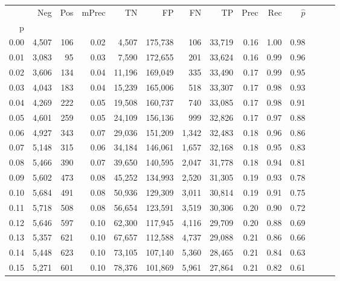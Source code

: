 \begin{tabular}{rrrrrrrrrrrrrr}
\toprule
{} &    Neg &  Pos & mPrec &       TN &       FP &      FN &      TP &  Prec &   Rec & $\hat{p}$ \\
p    &        &      &       &          &          &         &         &       &       &           \\
\midrule
0.00 &  4,507 &  106 &  0.02 &    4,507 &  175,738 &     106 &  33,719 &  0.16 &  1.00 &      0.98 \\
0.01 &  3,083 &   95 &  0.03 &    7,590 &  172,655 &     201 &  33,624 &  0.16 &  0.99 &      0.96 \\
0.02 &  3,606 &  134 &  0.04 &   11,196 &  169,049 &     335 &  33,490 &  0.17 &  0.99 &      0.95 \\
0.03 &  4,043 &  183 &  0.04 &   15,239 &  165,006 &     518 &  33,307 &  0.17 &  0.98 &      0.93 \\
0.04 &  4,269 &  222 &  0.05 &   19,508 &  160,737 &     740 &  33,085 &  0.17 &  0.98 &      0.91 \\
0.05 &  4,601 &  259 &  0.05 &   24,109 &  156,136 &     999 &  32,826 &  0.17 &  0.97 &      0.88 \\
0.06 &  4,927 &  343 &  0.07 &   29,036 &  151,209 &   1,342 &  32,483 &  0.18 &  0.96 &      0.86 \\
0.07 &  5,148 &  315 &  0.06 &   34,184 &  146,061 &   1,657 &  32,168 &  0.18 &  0.95 &      0.83 \\
0.08 &  5,466 &  390 &  0.07 &   39,650 &  140,595 &   2,047 &  31,778 &  0.18 &  0.94 &      0.81 \\
0.09 &  5,602 &  473 &  0.08 &   45,252 &  134,993 &   2,520 &  31,305 &  0.19 &  0.93 &      0.78 \\
0.10 &  5,684 &  491 &  0.08 &   50,936 &  129,309 &   3,011 &  30,814 &  0.19 &  0.91 &      0.75 \\
0.11 &  5,718 &  508 &  0.08 &   56,654 &  123,591 &   3,519 &  30,306 &  0.20 &  0.90 &      0.72 \\
0.12 &  5,646 &  597 &  0.10 &   62,300 &  117,945 &   4,116 &  29,709 &  0.20 &  0.88 &      0.69 \\
0.13 &  5,357 &  621 &  0.10 &   67,657 &  112,588 &   4,737 &  29,088 &  0.21 &  0.86 &      0.66 \\
0.14 &  5,448 &  623 &  0.10 &   73,105 &  107,140 &   5,360 &  28,465 &  0.21 &  0.84 &      0.63 \\
0.15 &  5,271 &  601 &  0.10 &   78,376 &  101,869 &   5,961 &  27,864 &  0.21 &  0.82 &      0.61 \\

\end{tabular}
